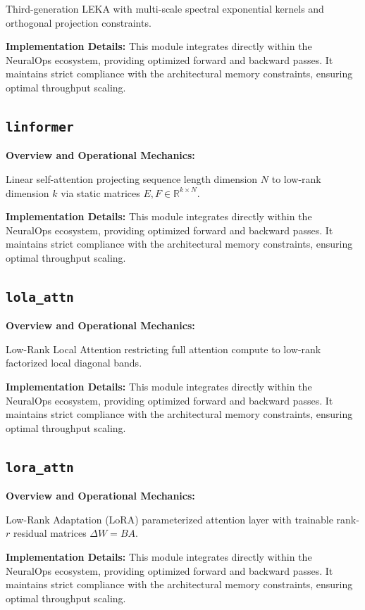 \documentclass[10pt,twocolumn,letterpaper]{article}
\begin{document}
Third-generation LEKA with multi-scale spectral exponential kernels and orthogonal projection constraints.

\textbf{Implementation Details:}
This module integrates directly within the NeuralOps ecosystem, providing optimized forward and backward passes. It maintains strict compliance with the architectural memory constraints, ensuring optimal throughput scaling.

\subsection{\texttt{linformer}}
\textbf{Overview and Operational Mechanics:}

Linear self-attention projecting sequence length dimension $N$ to low-rank dimension $k$ via static matrices $E, F \in \mathbb{R}^{k \times N}$.

\textbf{Implementation Details:}
This module integrates directly within the NeuralOps ecosystem, providing optimized forward and backward passes. It maintains strict compliance with the architectural memory constraints, ensuring optimal throughput scaling.

\subsection{\texttt{lola\_attn}}
\textbf{Overview and Operational Mechanics:}

Low-Rank Local Attention restricting full attention compute to low-rank factorized local diagonal bands.

\textbf{Implementation Details:}
This module integrates directly within the NeuralOps ecosystem, providing optimized forward and backward passes. It maintains strict compliance with the architectural memory constraints, ensuring optimal throughput scaling.

\subsection{\texttt{lora\_attn}}
\textbf{Overview and Operational Mechanics:}

Low-Rank Adaptation (LoRA) parameterized attention layer with trainable rank-$r$ residual matrices $\Delta W = B A$.

\textbf{Implementation Details:}
This module integrates directly within the NeuralOps ecosystem, providing optimized forward and backward passes. It maintains strict compliance with the architectural memory constraints, ensuring optimal throughput scaling.
\end{document}
